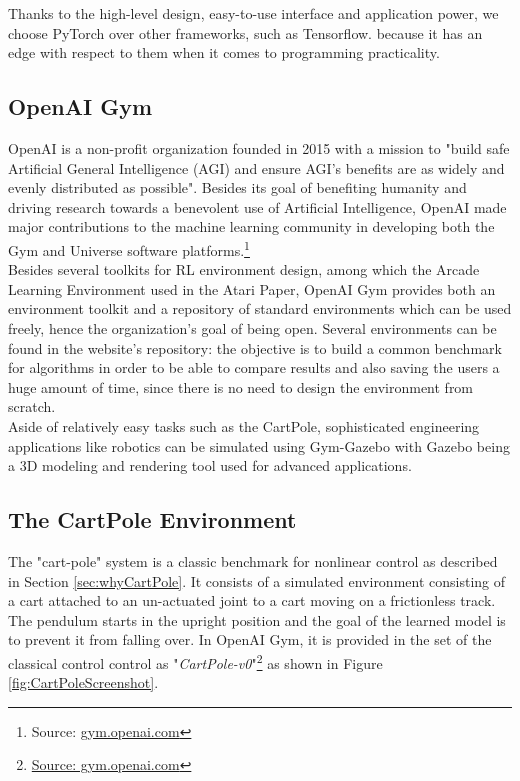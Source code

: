 Thanks to the high-level design, easy-to-use interface and application power, we choose PyTorch over other frameworks, such as Tensorflow. because it has an edge with respect to them when it comes to programming practicality.

\subsection{OpenAI Gym}

OpenAI is a non-profit organization founded in 2015 with a mission to "build safe Artificial General Intelligence (AGI) and ensure AGI's benefits are as widely and evenly distributed as possible". Besides its goal of benefiting humanity and driving research towards a benevolent use of Artificial Intelligence, OpenAI made major contributions to the machine learning community in developing both the Gym and Universe software platforms.\footnote{Source: \href{https://gym.openai.com/}{gym.openai.com}}
\\
\indent
Besides several toolkits for RL environment design, among which the Arcade Learning Environment used in the Atari Paper, OpenAI Gym provides both an environment toolkit and a repository of standard environments which can be used freely, hence the organization's goal of being open. Several environments can be found in the website's repository: the objective is to build a common benchmark for algorithms in order to be able to compare results and also saving the users a huge amount of time, since there is no need to design the environment from scratch.
\\
\indent Aside of relatively easy tasks such as the CartPole, sophisticated engineering applications like robotics can be simulated using Gym-Gazebo with Gazebo being a 3D modeling and rendering tool used for advanced applications.

\subsection{The CartPole Environment}

The "cart-pole" system is a classic benchmark for nonlinear control as described in Section \ref{sec:whyCartPole}. It consists of a simulated environment consisting of a cart attached to an un-actuated joint to a cart moving on  a frictionless track. The pendulum starts in the upright position and the goal of the learned model is to prevent it from falling over. In OpenAI Gym, it is provided in the set of the classical control control as "\textit{CartPole-v0}"\footnote{\href{https://gym.openai.com/envs/CartPole-v0/}{Source: gym.openai.com}} as shown in Figure \ref{fig:CartPoleScreenshot}.

